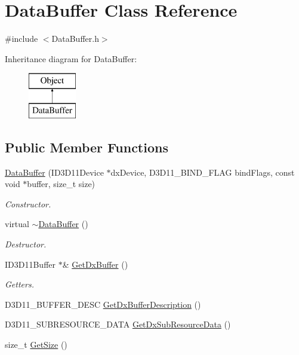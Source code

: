 \hypertarget{class_data_buffer}{}\section{Data\+Buffer Class Reference}
\label{class_data_buffer}


{\ttfamily \#include $<$Data\+Buffer.\+h$>$}

Inheritance diagram for Data\+Buffer\+:\begin{figure}[H]
\begin{center}
\leavevmode
\includegraphics[height=2.000000cm]{class_data_buffer}
\end{center}
\end{figure}
\subsection*{Public Member Functions}
\begin{DoxyCompactItemize}
\item 
\hyperlink{class_data_buffer_ad12238b0a14ce03f1f2812fd8ce9adf4}{Data\+Buffer} (I\+D3\+D11\+Device $\ast$dx\+Device, D3\+D11\+\_\+\+B\+I\+N\+D\+\_\+\+F\+L\+AG bind\+Flags, const void $\ast$buffer, size\+\_\+t size)
\begin{DoxyCompactList}\small\item\em Constructor. \end{DoxyCompactList}\item 
virtual \hyperlink{class_data_buffer_ac374f86810cc019a248be28d1babecdb}{$\sim$\+Data\+Buffer} ()
\begin{DoxyCompactList}\small\item\em Destructor. \end{DoxyCompactList}\item 
I\+D3\+D11\+Buffer $\ast$\& \hyperlink{class_data_buffer_a282a755677be1eac733f3e1e090e6069}{Get\+Dx\+Buffer} ()
\begin{DoxyCompactList}\small\item\em Getters. \end{DoxyCompactList}\item 
D3\+D11\+\_\+\+B\+U\+F\+F\+E\+R\+\_\+\+D\+E\+SC \hyperlink{class_data_buffer_a1012af5db0fb0dbc042a4d7ddc3d8249}{Get\+Dx\+Buffer\+Description} ()
\item 
D3\+D11\+\_\+\+S\+U\+B\+R\+E\+S\+O\+U\+R\+C\+E\+\_\+\+D\+A\+TA \hyperlink{class_data_buffer_a385e821a26a26326d22d92f7e9268469}{Get\+Dx\+Sub\+Resource\+Data} ()
\item 
size\+\_\+t \hyperlink{class_data_buffer_aaa2b70d7c6cc014e9ccd7e949ecbbf38}{Get\+Size} ()
\end{DoxyCompactItemize}
